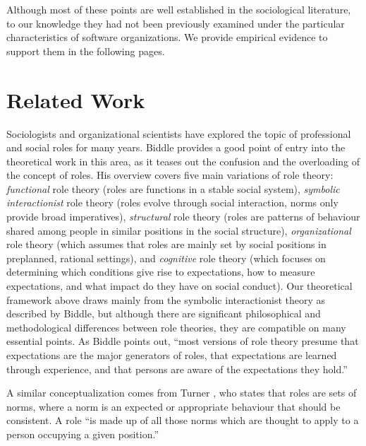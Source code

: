 \documentclass[10pt, conference, compsocconf]{IEEEtran}
\begin{document}
Although most of these points are well established in the sociological literature, to our knowledge they had not been previously examined under the particular characteristics of software organizations. We provide empirical evidence to support them in the following pages.




\section{Related Work}

Sociologists and organizational scientists have explored the topic of professional and social roles for many years. Biddle \cite{Biddle1986} provides a good point of entry into the theoretical work in this area, as it teases out the confusion and the overloading of the concept of roles. His overview covers five main variations of role theory: \emph{functional} role theory (roles are functions in a stable social system), \emph{symbolic interactionist} role theory (roles evolve through social interaction, norms only provide broad imperatives), \emph{structural} role theory (roles are patterns of behaviour shared among people in similar positions in the social structure), \emph{organizational} role theory (which assumes that roles are mainly set by social positions in preplanned, rational settings), and \emph{cognitive} role theory (which focuses on determining which conditions give rise to expectations, how to measure expectations, and what impact do they have on social conduct). Our theoretical framework above draws mainly from the symbolic interactionist theory as described by Biddle, but although there are significant philosophical and methodological differences between role theories, they are compatible on many essential points. As Biddle points out, ``most versions of role theory presume that expectations are the major generators of roles, that expectations are learned through experience, and that persons are aware of the expectations they hold.''

A similar conceptualization comes from Turner \cite{Turner1956}, who states that roles are sets of norms, where a norm is an expected or appropriate behaviour that should be consistent. A role ``is made up of all those norms which are thought to apply to a person occupying a given position.''
\end{document}
